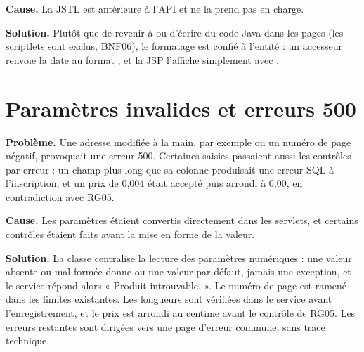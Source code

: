 \textbf{Cause.} La JSTL est antérieure à l'API  et ne la prend pas en charge.

\textbf{Solution.} Plutôt que de revenir à  ou d'écrire du code Java dans les pages (les
scriptlets sont exclus, BNF06), le formatage est confié à l'entité : un accesseur
 renvoie la date au format , et la JSP l'affiche
simplement avec .

\section{Paramètres invalides et erreurs 500}

\textbf{Problème.} Une adresse modifiée à la main, par exemple  ou un numéro de page
négatif, provoquait une erreur 500. Certaines saisies passaient aussi les contrôles par erreur : un champ plus
long que sa colonne produisait une erreur SQL à l'inscription, et un prix de 0,004 était accepté puis arrondi à
0,00, en contradiction avec RG05.

\textbf{Cause.} Les paramètres étaient convertis directement dans les servlets, et certains contrôles étaient
faits avant la mise en forme de la valeur.

\textbf{Solution.} La classe  centralise la lecture des paramètres numériques : une valeur
absente ou mal formée donne  ou une valeur par défaut, jamais une exception, et le service répond
alors « Produit introuvable. ». Le numéro de page est ramené dans les limites existantes. Les longueurs sont
vérifiées dans le service avant l'enregistrement, et le prix est arrondi au centime avant le contrôle de RG05.
Les erreurs restantes sont dirigées vers une page d'erreur commune, sans trace technique.
